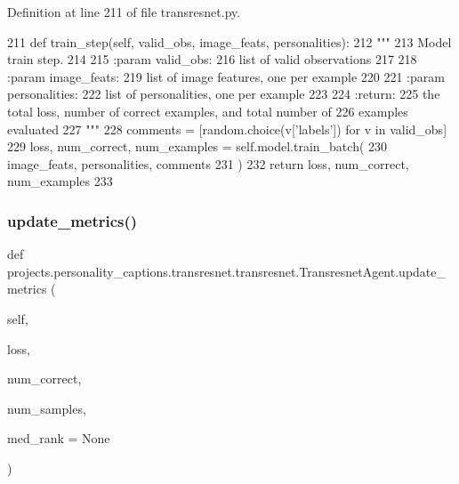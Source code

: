 Definition at line 211 of file transresnet.\+py.


\begin{DoxyCode}
211     \textcolor{keyword}{def }train\_step(self, valid\_obs, image\_feats, personalities):
212         \textcolor{stringliteral}{"""}
213 \textcolor{stringliteral}{        Model train step.}
214 \textcolor{stringliteral}{}
215 \textcolor{stringliteral}{        :param valid\_obs:}
216 \textcolor{stringliteral}{            list of valid observations}
217 \textcolor{stringliteral}{}
218 \textcolor{stringliteral}{        :param image\_feats:}
219 \textcolor{stringliteral}{            list of image features, one per example}
220 \textcolor{stringliteral}{}
221 \textcolor{stringliteral}{        :param personalities:}
222 \textcolor{stringliteral}{            list of personalities, one per example}
223 \textcolor{stringliteral}{}
224 \textcolor{stringliteral}{        :return:}
225 \textcolor{stringliteral}{            the total loss, number of correct examples, and total number of}
226 \textcolor{stringliteral}{            examples evaluated}
227 \textcolor{stringliteral}{        """}
228         comments = [random.choice(v[\textcolor{stringliteral}{'labels'}]) \textcolor{keywordflow}{for} v \textcolor{keywordflow}{in} valid\_obs]
229         loss, num\_correct, num\_examples = self.model.train\_batch(
230             image\_feats, personalities, comments
231         )
232         \textcolor{keywordflow}{return} loss, num\_correct, num\_examples
233 
\end{DoxyCode}
\mbox{\label{classprojects_1_1personality__captions_1_1transresnet_1_1transresnet_1_1TransresnetAgent_a59ccc8175318115d066f550659de70d3}} 
\subsubsection{\texorpdfstring{update\+\_\+metrics()}{update\_metrics()}}
{\footnotesize\ttfamily def projects.\+personality\+\_\+captions.\+transresnet.\+transresnet.\+Transresnet\+Agent.\+update\+\_\+metrics (\begin{DoxyParamCaption}\item[{}]{self,  }\item[{}]{loss,  }\item[{}]{num\+\_\+correct,  }\item[{}]{num\+\_\+samples,  }\item[{}]{med\+\_\+rank = {\ttfamily None} }\end{DoxyParamCaption})}

